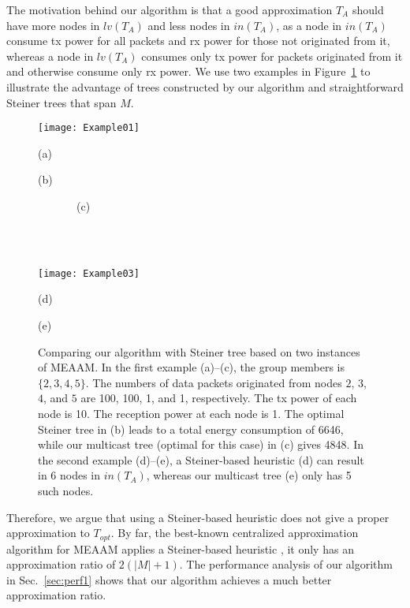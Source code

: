 \documentclass[10pt, conference, compsocconf]{IEEEtran}
\begin{document}
    The motivation behind our algorithm is that a good approximation $T_A$ should have more nodes in $\mathit{lv}(T_A)$ and less nodes in $\mathit{in}(T_A)$, as a node in $\mathit{in}(T_A)$ consume tx power for all packets and rx power for those not originated from it, whereas a node in $\mathit{lv}(T_A)$ consumes only tx power for packets originated from it and otherwise consume only rx power. We use two examples in Figure~\ref{fig:example} to illustrate the advantage of trees constructed by our algorithm and straightforward Steiner trees that span $M$.
\begin{figure}[htbp]
      \centerline{\texttt{[image: Example01]}}
      \parbox{.32\columnwidth}{\center\scriptsize(a)~~~~~~~}
      \parbox{.32\columnwidth}{\center\scriptsize(b)}
      \parbox{.32\columnwidth}{\center~~~~~~~\scriptsize(c)} \\ \\
      \centerline{\texttt{[image: Example03]}}
      \parbox{.49\columnwidth}{\center\scriptsize(d)}
      \parbox{.49\columnwidth}{\center\scriptsize(e)}
      \caption{Comparing our algorithm with Steiner tree based on two instances of MEAAM. In the first example (a)--(c), the group members is $\{2,3,4,5\}$. The numbers of data packets originated from nodes $2$, $3$, $4$, and $5$ are 100, 100, 1, and 1, respectively. The tx power of each node is 10. The reception power at each node is 1. The optimal Steiner tree in (b) leads to a total energy consumption of 6646, while our multicast tree (optimal for this case) in (c) gives 4848. In the second example (d)--(e), a Steiner-based heuristic (d) can result in 6 nodes in $\mathit{in}(T_A)$, whereas our multicast tree (e) only has 5 such nodes.}
      \label{fig:example}
    \end{figure}
Therefore, we argue that using a Steiner-based heuristic does not give a proper approximation to $T_{\mathit{opt}}$. By far, the best-known centralized approximation algorithm for MEAAM applies a Steiner-based heuristic \cite{Liang2009}, it only has an approximation ratio of $2(|M|+1)$. The performance analysis of our algorithm in Sec.~\ref{sec:perf1} shows that our algorithm achieves a much better approximation ratio.
\end{document}
